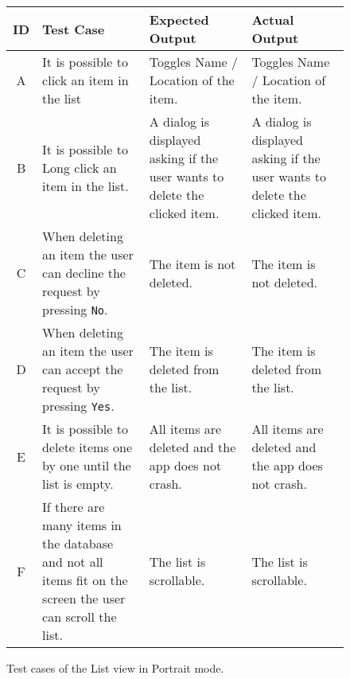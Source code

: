 \begin{figure}[H]
	\centering
	\renewcommand*{\arraystretch}{1.5} %
	\begin{tabular}{| c | p{3.5cm} | p{3.5cm} | p{3.5cm} |}
		\hline
		{\textbf{ID} } & {\textbf{Test Case} } & {\textbf{Expected Output}} & {\textbf {Actual Output}} \\\hline\hline
		A &	It is possible to click an item in the list & Toggles Name / Location of the item.  & Toggles Name / Location of the item. \\ \hline
		B & It is possible to Long click an item in the list. & A dialog is displayed asking if the user wants to delete the clicked item. & A dialog is displayed asking if the user wants to delete the clicked item. \\ \hline
		C & When deleting an item the user can decline the request by pressing \texttt{No}. & The item is not deleted. & The item is not deleted. \\ \hline
		D & When deleting an item the user can accept the request by pressing \texttt{Yes}. & The item is deleted from the list. & The item is deleted from the list. \\ \hline
		E & It is possible to delete items one by one until the list is empty. & All items are deleted and the app does not crash. & All items are deleted and the app does not crash. \\ \hline
		F & If there are many items in the database and not all items fit on the screen the user
		can scroll the list. & The list is scrollable. & The list is scrollable. \\ \hline
	\end{tabular}
	
	\caption{Test cases of the List view in Portrait mode.}
	\label{tab:test-cases-list-portrait}
\end{figure}


